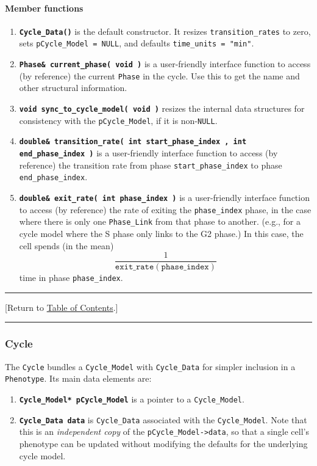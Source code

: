 \documentclass[12pt]{article}
\newcommand{\beq}{\begin{equation}}
\newcommand{\eeq}{\end{equation}}
\renewcommand{\v}{\verb}
\newcommand{\smallcode}[1]{\textbf{\texttt{#1}}}
\newcommand{\blue}[1]{\textcolor{blue}{#1}}
\newcommand{\DONE}{}%
\newcommand{\TOClink}{\begin{center}\hrule\vskip-5pt\phantom{.}\hfill[Return to \hyperlink{TOC}{Table of Contents}.]\hfill\phantom{.}\vskip3pt\hrule\end{center}}
\begin{document}
\paragraph{Member functions}
\begin{enumerate}
\item
\smallcode{Cycle\_Data()} is the default constructor. It resizes 
\v|transition_rates| to zero, sets \hfill\break
\v|pCycle_Model = NULL|, and defaults \v|time_units = "min"|. 

\item 
\smallcode{Phase\& current\_phase( void )} is a 
user-friendly interface function 
to access (by reference) the current \v|Phase| in the cycle. Use this to 
get the name and other structural information. 

\item 
\smallcode{void sync\_to\_cycle\_model( void )} resizes the internal data structures 
for consistency with the \v|pCycle_Model|, if it is non-\v|NULL|. 

\item 
\smallcode{double\& transition\_rate( int start\_phase\_index , int end\_phase\_index )} 
is a user-\hfill\break friendly interface function to access (by reference) the 
transition rate from phase \v|start_phase_index| to phase 
\v|end_phase_index|. 

\item
\smallcode{double\& exit\_rate( int\ phase\_index )} is a user-friendly interface 
function to access (by reference) the rate of exiting the 
\v|phase_index| phase, in the case where there is only one  
\v|Phase_Link| from that phase to another.  (e.g., for a cycle model 
where the S phase only links to the G2 phase.) In this case, 
the cell spends (in the mean) 
\beq
\frac{1}{\texttt{exit\_rate}(\texttt{phase\_index}) }\eeq
time in phase \v|phase_index|. 

\end{enumerate}

\TOClink 

\subsubsection{Cycle \DONE}
\label{sec:Cycle_Class}
The \v|Cycle| bundles a \v|Cycle_Model| with \v|Cycle_Data| for simpler 
inclusion in a \v|Phenotype|. Its main data elements are: 
\begin{enumerate}
\item 
\smallcode{Cycle\_Model* pCycle\_Model} is a pointer to a \v|Cycle_Model|. 

\item 
\smallcode{Cycle\_Data data} is \v|Cycle_Data| associated with the \v|Cycle_Model|. 
Note that this is an \emph{independent copy} of the 
\v|pCycle_Model->data|, so that a single cell's phenotype can be updated 
without modifying the defaults for the underlying cycle model. 

\end{enumerate}
\end{document}
